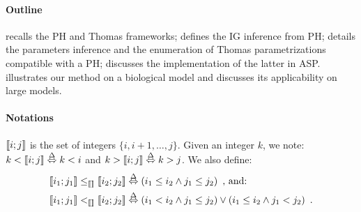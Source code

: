\paragraph{Outline}
 recalls the PH and Thomas frameworks;
 defines the IG inference from PH;
 details the parameters inference and the enumeration of Thomas parametrizations compatible with a PH;
 discusses the implementation of the latter in ASP.
 illustrates our method on a biological model
and discusses its applicability on large models.

\paragraph{Notations}
$\llbracket i ; j \rrbracket$ is the set of integers $\{ i, i+1, \dots, j \}$.
Given an integer $k$, we note: $k < \llbracket i ; j \rrbracket \stackrel{\Delta}\Leftrightarrow k < i$ and $k > \llbracket i ; j \rrbracket \stackrel{\Delta}\Leftrightarrow k > j$.
We also define:
\begin{align*}
  \llbracket i_1 ; j_1 \rrbracket \leq_{\llbracket\rrbracket} \llbracket i_2 ; j_2 \rrbracket &\stackrel{\Delta}\Leftrightarrow (i_1\leq i_2\wedge j_1\leq j_2) \enspace\text{, and:}\\
  \llbracket i_1 ; j_1 \rrbracket <_{\llbracket\rrbracket} \llbracket i_2 ; j_2 \rrbracket &\stackrel{\Delta}\Leftrightarrow (i_1<i_2 \wedge j_1\leq j_2) \vee (i_1\leq i_2\wedge j_1 < j_2) \enspace.
\end{align*}
